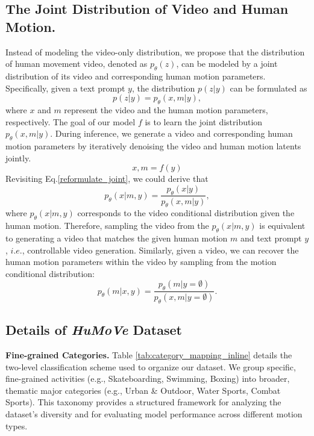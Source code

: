 \subsection{The Joint Distribution of Video and Human Motion.}

Instead of modeling the video-only distribution, we propose that the distribution of human movement video, denoted as $p_{\theta}(z)$, can be modeled by a joint distribution of its video and corresponding human motion parameters. Specifically, given a text prompt $y$, the distribution $p(z|y)$ can be formulated as
\begin{equation}\label{reformulate_joint}
p(z|y) = p_{\theta}(x, m | y),
\end{equation}
where $x$ and $m$ represent the video and the human motion parameters, respectively. The goal of our model $f$ is to learn the joint distribution $p_{\theta}(x, m | y)$. During inference, we generate a video and corresponding human motion parameters by iteratively denoising the video and human motion latents jointly.
\begin{equation}\label{joint_inference}
x, m = f(y)
\end{equation}
Revisiting Eq.\ref{reformulate_joint}, we could derive that
\begin{equation}\label{motion_to_video_distribution}
p_{\theta}(x|m,y) = \frac{p_{\theta}(x| y)}{p_{\theta}(x, m | y)},
\end{equation}
where $p_{\theta}(x|m,y)$ corresponds to the video conditional distribution given the human motion. Therefore, sampling the video from the $p_{\theta}(x|m,y)$ is equivalent to generating a video that matches the given human motion $m$ and text prompt $y$, $i.e.$, controllable video generation. Similarly, given a video, we can recover the human motion parameters within the video by sampling from the motion conditional distribution:
\begin{equation}\label{video_to_motion_distribution}
p_{\theta}(m|x,y) = \frac{p_{\theta}(m| y=\emptyset)}{p_{\theta}(x, m | y=\emptyset)}.
\end{equation}

\subsection{Details of \textit{HuMoVe} Dataset}\label{build_data}
\textbf{Fine-grained Categories.}
Table \ref{tab:category_mapping_inline} details the two-level classification scheme used to organize our dataset. We group specific, fine-grained activities (e.g., Skateboarding, Swimming, Boxing) into broader, thematic major categories (e.g., Urban \& Outdoor, Water Sports, Combat Sports). This taxonomy provides a structured framework for analyzing the dataset's diversity and for evaluating model performance across different motion types.

